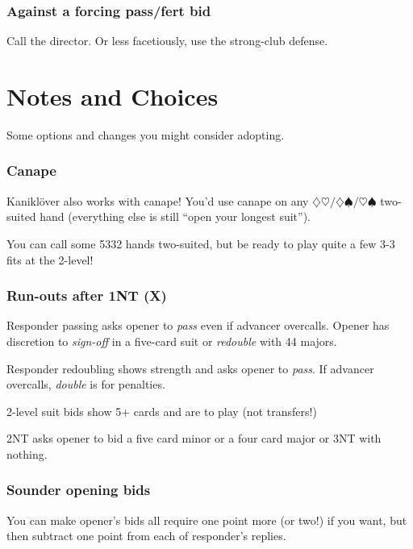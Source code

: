 \documentclass[a4paper, twoside, 11pt]{article}
\begin{document}
\begin{multicols}{3}
\subsubsection*{Against a forcing pass/fert bid}
Call the director. Or less facetiously, use the strong-club defense.


\section{Notes and Choices}
Some options and changes you might consider adopting.


\subsubsection*{Canape}
 Kaniklöver also works with canape! You'd use canape on any $\diamondsuit\heartsuit/ \diamondsuit\spadesuit/ \heartsuit\spadesuit$ two-suited hand (everything else is still ``open your longest suit'').

 You can call some 5332 hands two-suited, but be ready to play quite a few 3-3 fits at the 2-level!






\subsubsection*{Run-outs after 1NT (X)}

Responder passing asks opener to \textit{pass} even if advancer overcalls. Opener has discretion to \textit{sign-off} in a five-card suit or \textit{redouble} with 44 majors.

Responder redoubling shows strength and asks opener to \textit{pass}. If advancer overcalls, \textit{double} is for penalties.

2-level suit bids show 5+ cards and are to play (not transfers!)

2NT asks opener to bid a five card minor or a four card major or 3NT with nothing.







\subsubsection*{Sounder opening bids}
You can make opener's bids all require one point more (or two!) if you want, but then subtract one point from each of responder's replies.


\end{multicols}
\end{document}
